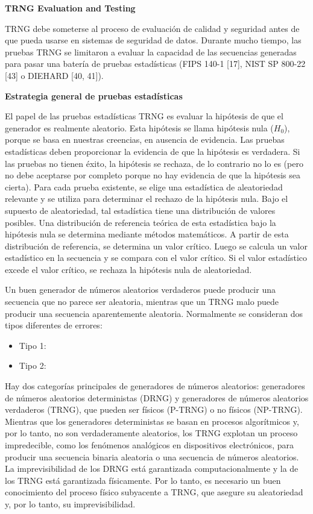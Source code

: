 			\textbf{TRNG Evaluation and Testing}
			
			TRNG debe someterse al proceso de evaluación de calidad y seguridad antes de que pueda usarse en sistemas de seguridad de datos. Durante mucho tiempo, las pruebas TRNG se limitaron a evaluar la capacidad de las secuencias generadas para pasar una batería de pruebas estadísticas (FIPS 140-1 [17], NIST SP 800-22 [43] o DIEHARD [40, 41]).
			
			\textbf{Estrategia general de pruebas estadísticas}
			
			El papel de las pruebas estadísticas TRNG es evaluar la hipótesis de que el generador es realmente aleatorio. Esta hipótesis se llama hipótesis nula ($H_{0}$), porque se basa en nuestras creencias, en ausencia de evidencia. Las pruebas estadísticas deben proporcionar la evidencia de que la hipótesis es verdadera. Si las pruebas no tienen éxito, la hipótesis se rechaza, de lo contrario no lo es (pero no debe aceptarse por completo porque no hay evidencia de que la hipótesis sea cierta). Para cada prueba existente, se elige una estadística de aleatoriedad relevante y se utiliza para determinar el rechazo de la hipótesis nula. Bajo el supuesto de aleatoriedad, tal estadística tiene una distribución de valores posibles. Una distribución de referencia teórica de esta estadística bajo la hipótesis nula se determina mediante métodos matemáticos. A partir de esta distribución de referencia, se determina un valor crítico. Luego se calcula un valor estadístico en la secuencia y se compara con el valor crítico. Si el valor estadístico excede el valor crítico, se rechaza la hipótesis nula de aleatoriedad.
			
			Un buen generador de números aleatorios verdaderos puede producir una secuencia que no parece ser aleatoria, mientras que un TRNG malo puede producir una secuencia aparentemente aleatoria.
Normalmente se consideran dos tipos diferentes de errores:		
	
		\begin{itemize}
			\item Tipo 1:
			\item Tipo 2: 
		\end{itemize}
	
			
			

			
			Hay dos categorías principales de generadores de números aleatorios: generadores de números aleatorios deterministas (DRNG) y generadores de números aleatorios verdaderos (TRNG), que pueden ser físicos (P-TRNG) o no físicos (NP-TRNG). Mientras que los generadores deterministas se basan en procesos algorítmicos y, por lo tanto, no son verdaderamente aleatorios, los TRNG explotan un proceso impredecible, como los fenómenos analógicos en dispositivos electrónicos, para producir una secuencia binaria aleatoria o una secuencia de números aleatorios. La imprevisibilidad de los DRNG está garantizada computacionalmente y la de los TRNG está garantizada físicamente. Por lo tanto, es necesario un buen conocimiento del proceso físico subyacente a TRNG, que asegure su aleatoriedad y, por lo tanto, su imprevisibilidad. \cite{Bernard2018} \cite{Haddad2015} \cite{Varchola2010}		
			
